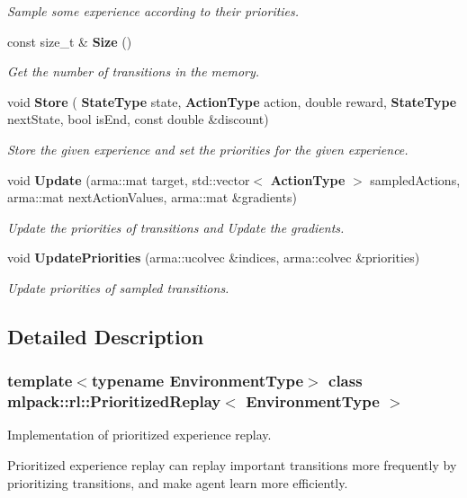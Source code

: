 \begin{DoxyCompactItemize}
\begin{DoxyCompactList}\small\item\em Sample some experience according to their priorities. \end{DoxyCompactList}\item 
const size\+\_\+t \& \textbf{ Size} ()
\begin{DoxyCompactList}\small\item\em Get the number of transitions in the memory. \end{DoxyCompactList}\item 
void \textbf{ Store} (\textbf{ State\+Type} state, \textbf{ Action\+Type} action, double reward, \textbf{ State\+Type} next\+State, bool is\+End, const double \&discount)
\begin{DoxyCompactList}\small\item\em Store the given experience and set the priorities for the given experience. \end{DoxyCompactList}\item 
void \textbf{ Update} (arma\+::mat target, std\+::vector$<$ \textbf{ Action\+Type} $>$ sampled\+Actions, arma\+::mat next\+Action\+Values, arma\+::mat \&gradients)
\begin{DoxyCompactList}\small\item\em Update the priorities of transitions and Update the gradients. \end{DoxyCompactList}\item 
void \textbf{ Update\+Priorities} (arma\+::ucolvec \&indices, arma\+::colvec \&priorities)
\begin{DoxyCompactList}\small\item\em Update priorities of sampled transitions. \end{DoxyCompactList}\end{DoxyCompactItemize}


\subsection{Detailed Description}
\subsubsection*{template$<$typename Environment\+Type$>$\newline
class mlpack\+::rl\+::\+Prioritized\+Replay$<$ Environment\+Type $>$}

Implementation of prioritized experience replay. 

Prioritized experience replay can replay important transitions more frequently by prioritizing transitions, and make agent learn more efficiently.


